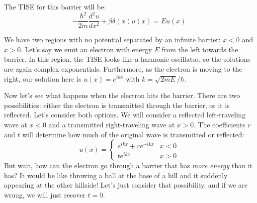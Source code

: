 \documentclass{article}
\begin{document}
The TISE for this barrier will be:
\begin{equation}
    -\frac{\hbar^2}{2m}\frac{d^2u}{dx^2} + \beta\delta(x)u(x)=Eu(x)
\end{equation}

We have two regions with no potential separated by an infinite barrier: $x<0$ and $x>0$. Let's say we emit an electron with energy $E$ from the left towards the barrier. In this region, the TISE looks like a harmonic oscillator, so the solutions are again complex exponentials. Furthermore, as the electron is moving to the right, our solution here is $u(x)=e^{ikx}$ with $k=\sqrt{2mE}/\hbar$.

Now let's see what happens when the electron hits the barrier. There are two possibilities: either the electron is transmitted through the barrier, or it is reflected. Let's consider both options. We will consider a reflected left-traveling wave at $x<0$ and a transmitted right-traveling wave at $x>0$. The coefficients $r$ and $t$ will determine how much of the original wave is transmitted or reflected:
\begin{equation}
    u(x)=\begin{cases}
        e^{ikx}+re^{-ikx} & x<0 \\
        te^{ikx} & x>0
    \end{cases}
\end{equation}
But wait, how can the electron go through a barrier that has \textit{more energy} than it has? It would be like throwing a ball at the base of a hill and it suddenly appearing at the other hillside! Let's just consider that possibility, and if we are wrong, we will just recover $t=0$.
\end{document}
